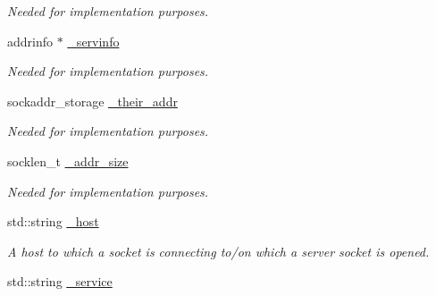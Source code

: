 \begin{DoxyCompactItemize}
\begin{DoxyCompactList}\small\item\em Needed for implementation purposes. \end{DoxyCompactList}\item 
\hypertarget{class_net_socket_p_p_1_1_net_socket_a000735c5be93aefd3297cd2eb3e55ec0}{addrinfo $\ast$ \hyperlink{class_net_socket_p_p_1_1_net_socket_a000735c5be93aefd3297cd2eb3e55ec0}{\-\_\-servinfo}}\label{class_net_socket_p_p_1_1_net_socket_a000735c5be93aefd3297cd2eb3e55ec0}

\begin{DoxyCompactList}\small\item\em Needed for implementation purposes. \end{DoxyCompactList}\item 
\hypertarget{class_net_socket_p_p_1_1_net_socket_aa608f4ab4af1be3c36831f4c0dd386cf}{sockaddr\-\_\-storage \hyperlink{class_net_socket_p_p_1_1_net_socket_aa608f4ab4af1be3c36831f4c0dd386cf}{\-\_\-their\-\_\-addr}}\label{class_net_socket_p_p_1_1_net_socket_aa608f4ab4af1be3c36831f4c0dd386cf}

\begin{DoxyCompactList}\small\item\em Needed for implementation purposes. \end{DoxyCompactList}\item 
\hypertarget{class_net_socket_p_p_1_1_net_socket_a8a19d20260ef37d1adbb7439a55b2b6a}{socklen\-\_\-t \hyperlink{class_net_socket_p_p_1_1_net_socket_a8a19d20260ef37d1adbb7439a55b2b6a}{\-\_\-addr\-\_\-size}}\label{class_net_socket_p_p_1_1_net_socket_a8a19d20260ef37d1adbb7439a55b2b6a}

\begin{DoxyCompactList}\small\item\em Needed for implementation purposes. \end{DoxyCompactList}\item 
\hypertarget{class_net_socket_p_p_1_1_net_socket_ad22749418d441f69226894af0f8467c5}{std\-::string \hyperlink{class_net_socket_p_p_1_1_net_socket_ad22749418d441f69226894af0f8467c5}{\-\_\-host}}\label{class_net_socket_p_p_1_1_net_socket_ad22749418d441f69226894af0f8467c5}

\begin{DoxyCompactList}\small\item\em A host to which a socket is connecting to/on which a server socket is opened. \end{DoxyCompactList}\item 
\hypertarget{class_net_socket_p_p_1_1_net_socket_a2db5c2f404edb3282384529e19ebe173}{std\-::string \hyperlink{class_net_socket_p_p_1_1_net_socket_a2db5c2f404edb3282384529e19ebe173}{\-\_\-service}}\label{class_net_socket_p_p_1_1_net_socket_a2db5c2f404edb3282384529e19ebe173}


\end{DoxyCompactItemize}
